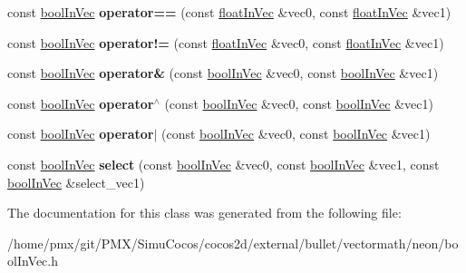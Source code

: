 \begin{DoxyCompactItemize}
\mbox{\label{classVectormath_1_1boolInVec_a0c3d1d83ce1a894626a8d4265a5f2ed9}} 
const \hyperlink{classVectormath_1_1boolInVec}{bool\+In\+Vec} {\bfseries operator==} (const \hyperlink{classVectormath_1_1floatInVec}{float\+In\+Vec} \&vec0, const \hyperlink{classVectormath_1_1floatInVec}{float\+In\+Vec} \&vec1)
\item 
\mbox{\label{classVectormath_1_1boolInVec_a4d52df8e4badb8a75fc9bc565a86ad94}} 
const \hyperlink{classVectormath_1_1boolInVec}{bool\+In\+Vec} {\bfseries operator!=} (const \hyperlink{classVectormath_1_1floatInVec}{float\+In\+Vec} \&vec0, const \hyperlink{classVectormath_1_1floatInVec}{float\+In\+Vec} \&vec1)
\item 
\mbox{\label{classVectormath_1_1boolInVec_a821c9dc1c95c7f257d9e7ab94ca08f13}} 
const \hyperlink{classVectormath_1_1boolInVec}{bool\+In\+Vec} {\bfseries operator\&} (const \hyperlink{classVectormath_1_1boolInVec}{bool\+In\+Vec} \&vec0, const \hyperlink{classVectormath_1_1boolInVec}{bool\+In\+Vec} \&vec1)
\item 
\mbox{\label{classVectormath_1_1boolInVec_a5c92593983de1257dafe7301c6665108}} 
const \hyperlink{classVectormath_1_1boolInVec}{bool\+In\+Vec} {\bfseries operator$^\wedge$} (const \hyperlink{classVectormath_1_1boolInVec}{bool\+In\+Vec} \&vec0, const \hyperlink{classVectormath_1_1boolInVec}{bool\+In\+Vec} \&vec1)
\item 
\mbox{\label{classVectormath_1_1boolInVec_a33e35c11ed0093bc8949a434da600031}} 
const \hyperlink{classVectormath_1_1boolInVec}{bool\+In\+Vec} {\bfseries operator$\vert$} (const \hyperlink{classVectormath_1_1boolInVec}{bool\+In\+Vec} \&vec0, const \hyperlink{classVectormath_1_1boolInVec}{bool\+In\+Vec} \&vec1)
\item 
\mbox{\label{classVectormath_1_1boolInVec_ac6cfb2aee5afd68adfddecc9f41d915b}} 
const \hyperlink{classVectormath_1_1boolInVec}{bool\+In\+Vec} {\bfseries select} (const \hyperlink{classVectormath_1_1boolInVec}{bool\+In\+Vec} \&vec0, const \hyperlink{classVectormath_1_1boolInVec}{bool\+In\+Vec} \&vec1, const \hyperlink{classVectormath_1_1boolInVec}{bool\+In\+Vec} \&select\+\_\+vec1)
\end{DoxyCompactItemize}


The documentation for this class was generated from the following file\+:\begin{DoxyCompactItemize}
\item 
/home/pmx/git/\+P\+M\+X/\+Simu\+Cocos/cocos2d/external/bullet/vectormath/neon/bool\+In\+Vec.\+h\end{DoxyCompactItemize}

